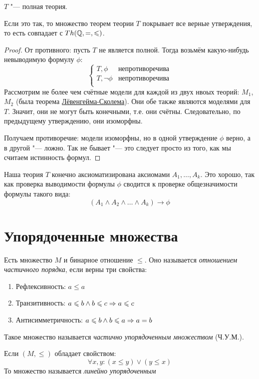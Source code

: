 \begin{assertion}
	$T$ "--- полная теория.
\end{assertion}
\begin{Rem}
	Если это так, то множество теорем теории $T$ покрывает все верные утверждения,
	то есть совпадает с $Th(\mathbb{Q}, =, \leqslant)$.
\end{Rem}
\begin{proof}
	От противного: пусть $T$ не является полной.
	Тогда возьмём какую-нибудь невыводимую формулу $\phi$:
	\[
		\begin{cases}
			T, \phi & \text{непротиворечива} \\
			T, \lnot\phi & \text{непротиворечива} \\
		\end{cases}
	\]
	Рассмотрим не более чем счётные модели для каждой из двух нвоых теорий: $M_1$, $M_2$
	(была теорема \hyperref[lowenheim]{Лёвенгейма-Сколема}).
	Они обе также являются моделями для $T$.
	Значит, они не могут быть конечными, т.е. они счётны.
	Следовательно, по предыдущему утверждению, они изоморфны.

	Получаем противоречие: модели изоморфны, но в одной утверждение $\phi$ верно,
	а в другой "--- ложно.
	Так не бывает "--- это следует просто из того, как мы считаем истинность формул.
\end{proof}

\begin{Rem}
	Наша теория $T$ конечно аксиоматизирована аксиомами $A_1, \dots, A_k$.
	Это хорошо, так как проверка выводимости формулы $\phi$ сводится к проверке
	общезначимости формулы такого вида:
	\[ (A_1 \land A_2 \land \dots \land A_k) \to \phi \]
\end{Rem}

\section{Упорядоченные множества}
\begin{Def}
	Есть множество $M$ и бинарное отношение $\le$.
	Оно называется \textit{отношением частичного порядка}, если верны три свойства:
	\begin{enumerate}
		\item Рефлексивность: $a \le a$ 
		\item Транзитивность: $a \leqslant b \land b \leqslant c \Rightarrow a \leqslant c$
		\item Антисимметричность: $a \leqslant b \land b \leqslant a \Rightarrow a = b$
	\end{enumerate}
	Такое множество называется \textit{частично упорядоченным множеством} (Ч.У.М.).
\end{Def}
\begin{Def}
	Если $(M, \le)$ обладает свойством:
	\[ \forall x, y \colon (x \le y) \lor (y \le x) \]
	То множество называется \textit{линейно упорядоченным}
\end{Def}

